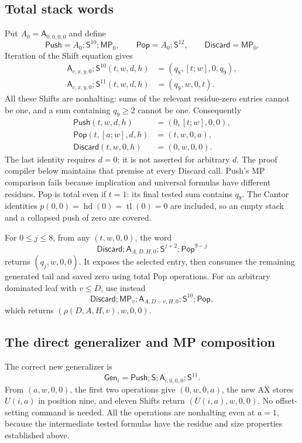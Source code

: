 \subsection{Total stack words}

Put $A_0=\mathsf A_{0,0,0,0}$ and define
\[
 \mathsf{Push}=A_0;\mathsf S^{10};\mathsf{MP}_0,\qquad
 \mathsf{Pop}=A_0;\mathsf S^{12},\qquad
 \mathsf{Discard}=\mathsf{MP}_0.
\]
Iteration of the Shift equation gives
\begin{align*}
 \mathsf A_{c,x,y,0};\mathsf S^{10}(t,w,d,h)
       &=(q_8,[t;w],0,q_9),\\
 \mathsf A_{c,x,y,0};\mathsf S^{11}(t,w,d,h)
       &=(q_9,w,0,t).
\end{align*}
All these Shifts are nonhalting: sums of the relevant residue-zero entries
cannot be one, and a sum containing $q_9\ge2$ cannot be one. Consequently
\begin{align*}
 \mathsf{Push}(t,w,d,h)&=(0,[t;w],0,0),\\
 \mathsf{Pop}(t,[a;w],d,h)&=(t,w,0,a),\\
 \mathsf{Discard}(t,w,0,h)&=(0,w,0,0).
\end{align*}
The last identity requires $d=0$; it is not asserted for arbitrary $d$.
The proof compiler below maintains that premise at every Discard call.
Push's MP comparison fails because implication and universal formulas have
different residues. Pop is total even if $t=1$: its final tested sum
contains $q_9$. The Cantor identities
$p(0,0)=\operatorname{hd}(0)=\operatorname{tl}(0)=0$ are included, so an
empty stack and a collapsed push of zero are covered.

For $0\le j\le8$, from any $(t,w,0,0)$, the word
\[
 \mathsf{Discard};\mathsf A_{A,D,H,0};
       \mathsf S^{j+2};\mathsf{Pop}^{9-j}
\]
returns $(q_j,w,0,0)$. It exposes the selected entry, then consumes the
remaining generated tail and saved zero using total Pop operations. For an
arbitrary dominated leaf with $v\le D$, use instead
\[
 \mathsf{Discard};\mathsf{MP}_v;
 \mathsf A_{A,D-v,H,0};\mathsf S^{10};\mathsf{Pop},
\]
which returns $(\rho(D,A,H,v),w,0,0)$.

\subsection{The direct generalizer and MP composition}

The correct new generalizer is
\[
 \mathsf{Gen}_i=\mathsf{Push};\mathsf S;
                 \mathsf A_{i,0,0,0};\mathsf S^{11}.
\]
From $(a,w,0,0)$, the first two operations give $(0,w,0,a)$, the new AX
stores $U(i,a)$ in position nine, and eleven Shifts return
$(U(i,a),w,0,0)$. No offset-setting command is needed. All the operations
are nonhalting even at $a=1$, because the intermediate tested formulas have
the residue and size properties established above.

